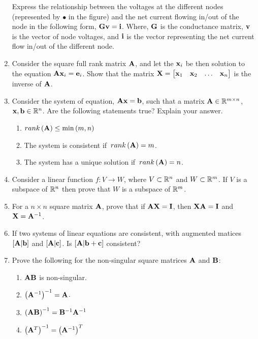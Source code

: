 \documentclass[9pt]{article}
\def\mf{\ensuremath\mathbf}
\def\mb{\ensuremath\mathbb}
\def\lp{\ensuremath\left(}
\def\rp{\ensuremath\right)}
\def\bmx{\ensuremath\begin{bmatrix*}[r]}
\def\emx{\ensuremath\end{bmatrix*}}
\newcommand{\ct}[1]{\lp #1\rp}
\begin{document}
\begin{multicols}{2}
\begin{enumerate}
     Express the relationship between the voltages at the different nodes (represented by $\bullet$ in the figure) and the net current flowing in/out of the node in the following form, $\mf{G}\mf{v} = \mf{i}$. Where, $\mf{G}$ is the conductance matrix, $\mf{v}$ is the vector of node voltages, and $\mf{i}$ is the vector representing the net current flow in/out of the different node.

    \item Consider the square full rank matrix $\mf{A}$, and let the $\mf{x}_i$ be then solution to the equation $\mf{A}\mf{x}_i = \mf{e}_i$. Show that the matrix $\mf{X} = \bmx \mf{x}_1 & \mf{x}_2 & \ldots & \mf{x}_n \emx$ is the inverse of $\mf{A}$.


    \item Consider the system of equation, $\mf{Ax} = \mf{b}$, such that a matrix $\mf{A} \in \mb{R}^{m \times n}$, $\mf{x}, \mf{b} \in \mb{R}^n$. Are the following statements true? Explain your answer.
    \begin{enumerate}
        \item $rank \lp \mf{A} \rp \leq \min \lp m, n \rp$
        \item The system is consistent if $\,rank\lp \mf{A} \rp = m$.
        \item The system has a unique solution if $\,rank \lp \mf{A} \rp = n$.
    \end{enumerate}

    \item Consider a linear function $f: V \to W$, where $V \subset \mb{R}^n$ and $W \subset \mb{R}^m$. If $V$ is a subspace of $\mb{R}^n$ then prove that $W$ is a subspace of $\mb{R}^m$.   

    \item For a $n \times n$ square matrix $\mf{A}$, prove that if $\mf{A}\mf{X} = \mf{I}$, then $\mf{X}\mf{A} = \mf{I}$ and $\mf{X} = \mf{A}^{-1}$.

    \item If two systems of linear equations are consistent, with augmented matices $\left[ \mf{A} | \mf{b}\right]$ and $\left[ \mf{A} | \mf{c}\right]$. Is $\left[ \mf{A} | \mf{b} + \mf{c}\right]$ consistent?

    \item Prove the following for the non-singular square matrices $\mf{A}$ and $\mf{B}$:
    \begin{enumerate}
        \item $\mf{A}\mf{B}$ is non-singular.
        \item $\ct{\mf{A}^{-1}}^{-1} = \mf{A}$.
        \item $\ct{\mf{A}\mf{B}}^{-1} = \mf{B}^{-1}\mf{A}^{-1}$
        \item $\ct{\mf{A}^T}^{-1} = \ct{\mf{A}^{-1}}^T$
    \end{enumerate}


\end{enumerate}
\end{multicols}
\end{document}
